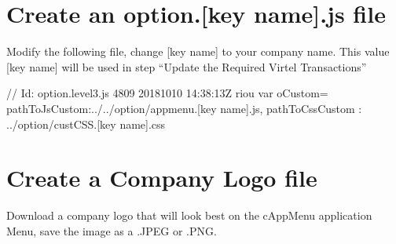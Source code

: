 \documentclass[letterpaper,10pt,english]{sphinxmanual}
\begin{document}
\begin{sphinxVerbatim}[commandchars=\\\{\}]
         
       
 
 
 
 
  
 
\end{sphinxVerbatim}


\section{Create an option.{[}key name{]}.js file}
\label{\detokenize{Customization:create-an-option-key-name-js-file}}
Modify the following file, change {[}key name{]} to your company name.  This value {[}key name{]}  will be used in step “Update the Required Virtel Transactions”

\begin{sphinxVerbatim}[commandchars=\\\{\}]
// \PYGZdl{}Id: option.level3.js 4809 2018\PYGZhy{}10\PYGZhy{}10 14:38:13Z riou \PYGZdl{}
var oCustom=\PYGZob{}
    \PYGZdq{}pathToJsCustom\PYGZdq{}:\PYGZdq{}../../option/appmenu.[key name].js\PYGZdq{},
    \PYGZdq{}pathToCssCustom\PYGZdq{} : \PYGZdq{}../option/custCSS.[key name].css\PYGZdq{}
    \PYGZcb{}
\end{sphinxVerbatim}


\section{Create a Company Logo file}
\label{\detokenize{Customization:create-a-company-logo-file}}
Download a company logo that will look best on the cAppMenu application Menu, save the image as a .JPEG or .PNG.
\end{document}
